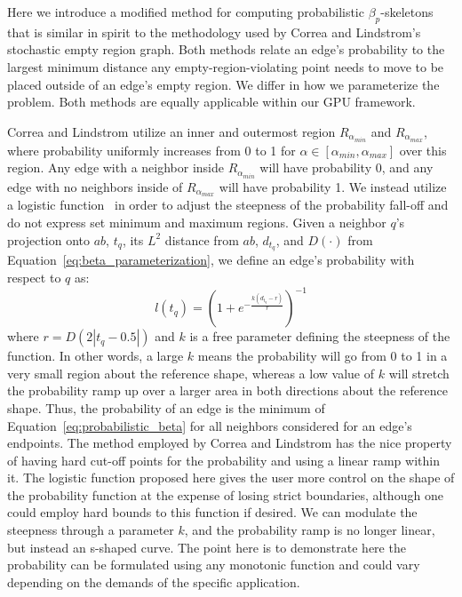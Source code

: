 Here we introduce a modified method for computing probabilistic $\beta_p$-skeletons that is similar in spirit to the methodology used by Correa and Lindstrom's stochastic empty region graph.
%
Both methods relate an edge's probability to the largest minimum distance any empty-region-violating point needs to move to be placed outside of an edge's empty region.
%
We differ in how we parameterize the problem.
%
Both methods are equally applicable within our GPU framework.

Correa and Lindstrom utilize an inner and outermost region $R_{\alpha_{min}}$ and $R_{\alpha_{max}}$, where probability uniformly increases from 0 to 1 for $\alpha \in [\alpha_{min},\alpha_{max}]$ over this region.
%
Any edge with a neighbor inside $R_{\alpha_{min}}$ will have probability 0, and any edge with no neighbors inside of $R_{\alpha_{max}}$ will have probability 1.
%
We instead utilize a logistic function~\cite{Cramer2002} in order to adjust the steepness of the probability fall-off and do not express set minimum and maximum regions.
%
Given a neighbor $q$'s projection onto $ab$, $t_q$, its $L^2$ distance from $ab$, $d_{t_q}$, and $D(\cdot)$ from Equation~\ref{eq:beta_parameterization}, we define an edge's probability with respect to $q$ as:
%
\begin{equation}
\label{eq:probabilistic_beta}
    l(t_q) = \left(1 + e^{-\frac{k\left(d_{t_q}-r\right)}{r}}\right)^{-1}
\end{equation}
%
where $r = D(2|t_q - 0.5|)$ and $k$ is a free parameter defining the steepness of the function.
%
In other words, a large $k$ means the probability will go from 0 to 1 in a very small region about the reference shape, whereas a low value of $k$ will stretch the probability ramp up over a larger area in both directions about the reference shape.
%
Thus, the probability of an edge is the minimum of Equation~\ref{eq:probabilistic_beta} for all neighbors considered for an edge's endpoints.
%
The method employed by Correa and Lindstrom has the nice property of having hard cut-off points for the probability and using a linear ramp within it.
%
The logistic function proposed here gives the user more control on the shape of the probability function at the expense of losing strict boundaries, although one could employ hard bounds to this function if desired.
%
We can modulate the steepness through a parameter $k$, and the probability ramp is no longer linear, but instead an s-shaped curve.
%
The point here is to demonstrate here the probability can be formulated using any monotonic function and could vary depending on the demands of the specific application.

